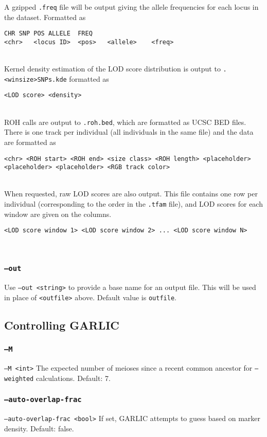 \documentclass[12pt]{article}%
\begin{document}
A gzipped {\tt .freq} file will be output giving the allele frequencies for each locus in the dataset.  Formatted as
\begin{lstlisting}
CHR	SNP	POS	ALLELE	FREQ
<chr>	<locus ID>	<pos>	<allele>	<freq>
\end{lstlisting}
~\\
Kernel density estimation of the LOD score distribution is output to {\tt .<winsize>SNPs.kde} formatted as
\begin{lstlisting}
<LOD score> <density>
\end{lstlisting}
~\\
ROH calls are output to {\tt .roh.bed}, which are formatted as UCSC BED files. There is one track per individual (all individuals in the same file) and the data are formatted as
\begin{lstlisting}
<chr> <ROH start> <ROH end> <size class> <ROH length> <placeholder> <placeholder> <placeholder> <RGB track color>
\end{lstlisting}
~\\
When requested, raw LOD scores are also output.  This file contains one row per individual (corresponding to the order in the {\tt .tfam} file), and LOD scores for each window are given on the columns.
\begin{lstlisting}
<LOD score window 1> <LOD score window 2> ... <LOD score window N>
\end{lstlisting}
~\\

\subsubsection{{\tt --out}}

Use {\tt --out <string>} to provide a base name for an output file.  This will be used in place of {\tt <outfile>} above.  Default value is {\tt outfile}.  

\subsection{Controlling GARLIC}

\subsubsection{{\tt --M}}
{\tt --M <int>} The expected number of meioses since a recent common ancestor for {\tt --weighted} calculations. Default: 7.

\subsubsection{{\tt --auto-overlap-frac}}
{\tt --auto-overlap-frac <bool>} If set, GARLIC attempts to guess based on marker density. Default: false.
\end{document}
